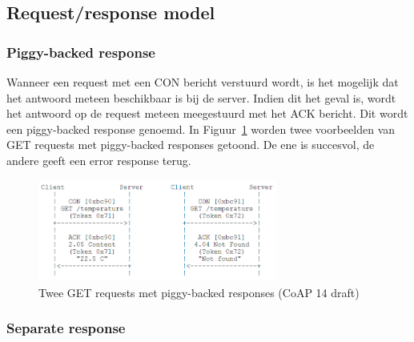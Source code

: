 \subsection{Request/response model}

\subsubsection{Piggy-backed response}

Wanneer een request met een CON bericht verstuurd wordt, is het mogelijk dat het antwoord meteen beschikbaar is bij de server. Indien dit het geval is, wordt het antwoord op de request meteen meegestuurd met het ACK bericht. Dit wordt een piggy-backed response genoemd. In Figuur~\ref{fig:CoAPPiggyBacked} worden twee voorbeelden van GET requests met piggy-backed responses getoond. De ene is succesvol, de andere geeft een error response terug.
\begin{figure}[h]
\vspace{10pt}
\centering
\includegraphics[width=0.7\textwidth]{fig/CoAPPiggyBacked}
\caption{Twee GET requests met piggy-backed responses (CoAP 14 draft)}
\label{fig:CoAPPiggyBacked}
\vspace{-20pt}
\end{figure}

\newpage

\subsubsection{Separate response} \label{separate}

